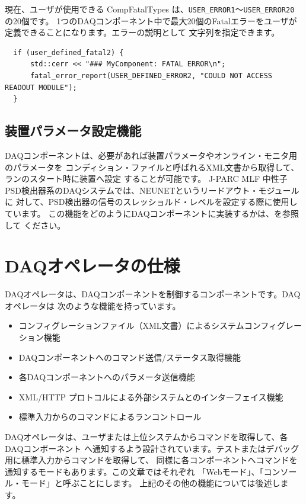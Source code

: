 \documentclass[a4j,10pt,dvips,onecolumn,oneside,final]{jarticle}%
\begin{document}
現在、ユーザが使用できる CompFatalTypes は、\verb|USER_ERROR1|〜\verb|USER_ERROR20| の20個です。
1つのDAQコンポーネント中で最大20個のFatalエラーをユーザが定義できることになります。エラーの説明として
文字列を指定できます。
\begin{Verbatim}
  if (user_defined_fatal2) {
      std::cerr << "### MyComponent: FATAL ERROR\n";
      fatal_error_report(USER_DEFINED_ERROR2, "COULD NOT ACCESS READOUT MODULE");
  }
\end{Verbatim}

\subsection{装置パラメータ設定機能}\label{comp-cond}
DAQコンポーネントは、必要があれば装置パラメータやオンライン・モニタ用のパラメータを
コンディション・ファイルと呼ばれるXML文書から取得して、ランのスタート時に装置へ設定
することが可能です。
J-PARC MLF 中性子PSD検出器系のDAQシステムでは、NEUNETというリードアウト・モジュールに
対して、PSD検出器の信号のスレッショルド・レベルを設定する際に使用しています。
この機能をどのようにDAQコンポーネントに実装するかは、\cite{Cond-manual}を参照して
ください。

\section{DAQオペレータの仕様}\label{daqop}
DAQオペレータは、DAQコンポーネントを制御するコンポーネントです。DAQオペレータは
次のような機能を持っています。
\begin{itemize}
\item コンフィグレーションファイル（XML文書）によるシステムコンフィグレーション機能
\item DAQコンポーネントへのコマンド送信/ステータス取得機能
\item 各DAQコンポーネントへのパラメータ送信機能
\item XML/HTTP プロトコルによる外部システムとのインターフェイス機能
\item 標準入力からのコマンドによるランコントロール
\end{itemize}

DAQオペレータは、ユーザまたは上位システムからコマンドを取得して、各DAQコンポーネント
へ通知するよう設計されています。テストまたはデバッグ用に標準入力からコマンドを取得して、
同様に各コンポーネントへコマンドを通知するモードもあります。この文章ではそれぞれ
「Webモード」、「コンソール・モード」と呼ぶことにします。
上記のその他の機能については後述します。
\end{document}

